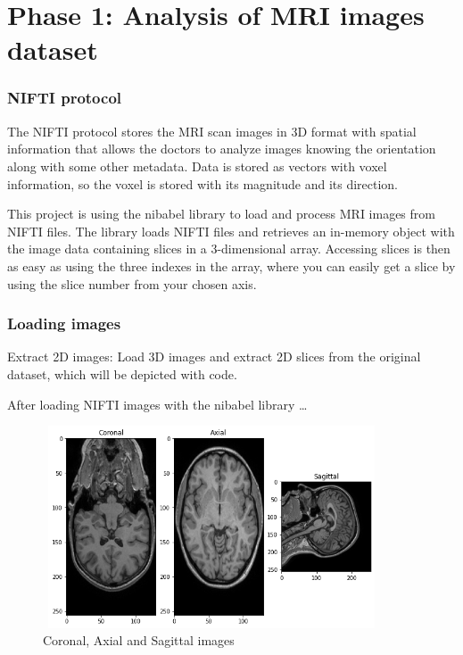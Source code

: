 \section{Phase 1: Analysis of MRI images dataset}

\subsubsection*{NIFTI protocol}

The NIFTI protocol stores the MRI scan images in 3D format with spatial information that allows the doctors to analyze images knowing the orientation along with some other metadata. Data is stored as vectors with voxel information, so the voxel is stored with its magnitude and its direction.

This project is using the nibabel \cite{nibabel} library to load and process MRI images from NIFTI files. The library loads NIFTI files and retrieves an in-memory object with the image data containing slices in a 3-dimensional array. Accessing slices is then as easy as using the three indexes in the array, where you can easily get a slice by using the slice number from your chosen axis.

\subsubsection*{Loading images}
Extract 2D images: Load 3D images and extract 2D slices from the original dataset, which will be depicted with code.

After loading NIFTI images with the nibabel library \dots

\begin{figure}[ht]
    \centering
    \includegraphics[width = 10cm, height = 6cm]{images/3-axis.png}
    \caption[Coronal, Axial and Sagittal images]{Coronal, Axial and Sagittal images}
    \label{fig:3-axis}
\end{figure}

